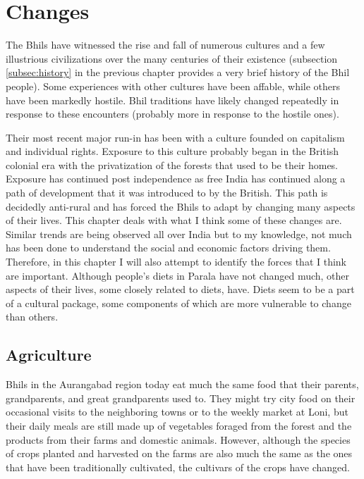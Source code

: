 \documentclass[report.tex]{subfiles}
\begin{document}
\chapter{Changes}\label{chp:changes}

The Bhils have witnessed the rise and fall of numerous cultures and a few illustrious civilizations over the many centuries of their existence (subsection \ref{subsec:history} in the previous chapter provides a very brief history of the Bhil people). Some experiences with other cultures have been affable, while others have been markedly hostile. Bhil traditions have likely changed repeatedly in response to these encounters (probably more in response to the hostile ones).

Their most recent major run-in has been with a culture founded on capitalism and individual rights. Exposure to this culture probably began in the British colonial era with the privatization of the forests that used to be their homes. Exposure has continued post independence as free India has continued along a path of development that it was introduced to by the British. This path is decidedly anti-rural and has forced the Bhils to adapt by changing many aspects of their lives. This chapter deals with what I think some of these changes are. Similar trends are being observed all over India but to my knowledge, not much has been done to understand the social and economic factors driving them. Therefore, in this chapter I will also attempt to identify the forces that I think are important. Although people's diets in Parala have not changed much, other aspects of their lives, some closely related to diets, have. Diets seem to be a part of a cultural package, some components of which are more vulnerable to change than others.

\section{Agriculture}\label{sec:agriculture}

Bhils in the Aurangabad region today eat much the same food that their parents, grandparents, and great grandparents used to. They might try city food on their occasional visits to the neighboring towns or to the weekly market at Loni, but their daily meals are still made up of vegetables foraged from the forest and the products from their farms and domestic animals. However, although the species of crops planted and harvested on the farms are also much the same as the ones that have been traditionally cultivated, the cultivars of the crops have changed.
\end{document}
